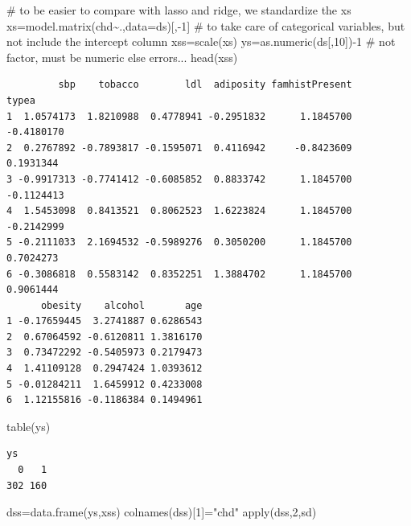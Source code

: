\documentclass[
  letterpaper,
  DIV=11,
  numbers=noendperiod]{scrartcl}
\newenvironment{Shaded}{\begin{snugshade}}{\end{snugshade}}
\newcommand{\AttributeTok}[1]{\textcolor[rgb]{0.40,0.45,0.13}{#1}}
\newcommand{\CommentTok}[1]{\textcolor[rgb]{0.37,0.37,0.37}{#1}}
\newcommand{\DecValTok}[1]{\textcolor[rgb]{0.68,0.00,0.00}{#1}}
\newcommand{\FunctionTok}[1]{\textcolor[rgb]{0.28,0.35,0.67}{#1}}
\newcommand{\NormalTok}[1]{\textcolor[rgb]{0.00,0.23,0.31}{#1}}
\newcommand{\OtherTok}[1]{\textcolor[rgb]{0.00,0.23,0.31}{#1}}
\newcommand{\SpecialCharTok}[1]{\textcolor[rgb]{0.37,0.37,0.37}{#1}}
\newcommand{\StringTok}[1]{\textcolor[rgb]{0.13,0.47,0.30}{#1}}
\begin{document}
\begin{Shaded}
\begin{Highlighting}[]
\CommentTok{\# to be easier to compare with lasso and ridge, we standardize the xs}
\NormalTok{xs}\OtherTok{=}\FunctionTok{model.matrix}\NormalTok{(chd}\SpecialCharTok{\textasciitilde{}}\NormalTok{.,}\AttributeTok{data=}\NormalTok{ds)[,}\SpecialCharTok{{-}}\DecValTok{1}\NormalTok{] }\CommentTok{\# to take care of categorical variables, but not include the intercept column}
\NormalTok{xss}\OtherTok{=}\FunctionTok{scale}\NormalTok{(xs)}
\NormalTok{ys}\OtherTok{=}\FunctionTok{as.numeric}\NormalTok{(ds[,}\DecValTok{10}\NormalTok{])}\SpecialCharTok{{-}}\DecValTok{1} \CommentTok{\# not factor, must be numeric else errors...}
\FunctionTok{head}\NormalTok{(xss)}
\end{Highlighting}
\end{Shaded}

\begin{verbatim}
         sbp    tobacco        ldl  adiposity famhistPresent      typea
1  1.0574173  1.8210988  0.4778941 -0.2951832      1.1845700 -0.4180170
2  0.2767892 -0.7893817 -0.1595071  0.4116942     -0.8423609  0.1931344
3 -0.9917313 -0.7741412 -0.6085852  0.8833742      1.1845700 -0.1124413
4  1.5453098  0.8413521  0.8062523  1.6223824      1.1845700 -0.2142999
5 -0.2111033  2.1694532 -0.5989276  0.3050200      1.1845700  0.7024273
6 -0.3086818  0.5583142  0.8352251  1.3884702      1.1845700  0.9061444
      obesity    alcohol       age
1 -0.17659445  3.2741887 0.6286543
2  0.67064592 -0.6120811 1.3816170
3  0.73472292 -0.5405973 0.2179473
4  1.41109128  0.2947424 1.0393612
5 -0.01284211  1.6459912 0.4233008
6  1.12155816 -0.1186384 0.1494961
\end{verbatim}

\begin{Shaded}
\begin{Highlighting}[]
\FunctionTok{table}\NormalTok{(ys)}
\end{Highlighting}
\end{Shaded}

\begin{verbatim}
ys
  0   1 
302 160 
\end{verbatim}

\begin{Shaded}
\begin{Highlighting}[]
\NormalTok{dss}\OtherTok{=}\FunctionTok{data.frame}\NormalTok{(ys,xss)}
\FunctionTok{colnames}\NormalTok{(dss)[}\DecValTok{1}\NormalTok{]}\OtherTok{=}\StringTok{"chd"}
\FunctionTok{apply}\NormalTok{(dss,}\DecValTok{2}\NormalTok{,sd)}
\end{Highlighting}
\end{Shaded}
\end{document}
